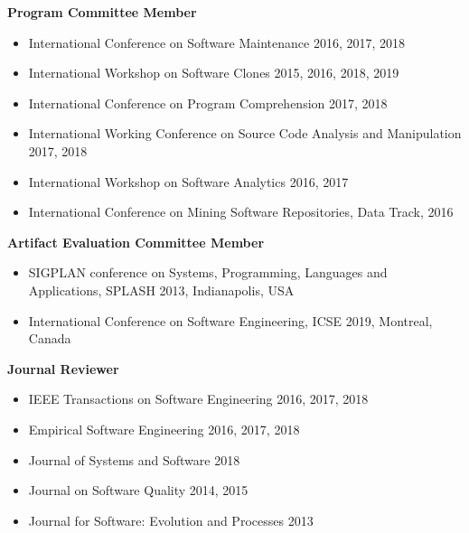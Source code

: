 \documentclass[letterpaper,11pt]{article}
\begin{document}
\textbf{Program Committee Member}


\begin{itemize}

  \item\small{International Conference on Software Maintenance 2016, 2017, 2018}
  \vspace{-5pt}\item\small{International Workshop on Software Clones 2015, 2016, 2018, 2019}
  \vspace{-5pt}\item\small{International Conference on Program Comprehension 2017, 2018}
  \vspace{-5pt}\item\small{ International Working Conference on Source Code Analysis and Manipulation 2017, 2018}
  \vspace{-5pt}\item\small{ International Workshop on Software Analytics 2016, 2017}
   \vspace{-5pt}\item\small{International Conference on Mining Software Repositories, Data Track, 2016}

\end{itemize}

\textbf{Artifact Evaluation Committee Member}

\begin{itemize}
\item\small{SIGPLAN conference on Systems, Programming, Languages and Applications, SPLASH 2013,
Indianapolis, USA}
  \vspace{-5pt}\item\small{International Conference on Software Engineering, ICSE 2019,
Montreal, Canada}

\end{itemize}

\textbf{Journal Reviewer}

\begin{itemize}

  \item\small{IEEE Transactions on Software Engineering 2016, 2017, 2018}
  \vspace{-5pt}\item\small{Empirical Software Engineering 2016, 2017, 2018}
  \vspace{-5pt}\item\small{Journal of Systems and Software 2018}
  \vspace{-5pt}\item\small{Journal on Software Quality 2014, 2015}
  \vspace{-5pt}\item\small{Journal for Software: Evolution and Processes 2013}

\end{itemize}
\end{document}
